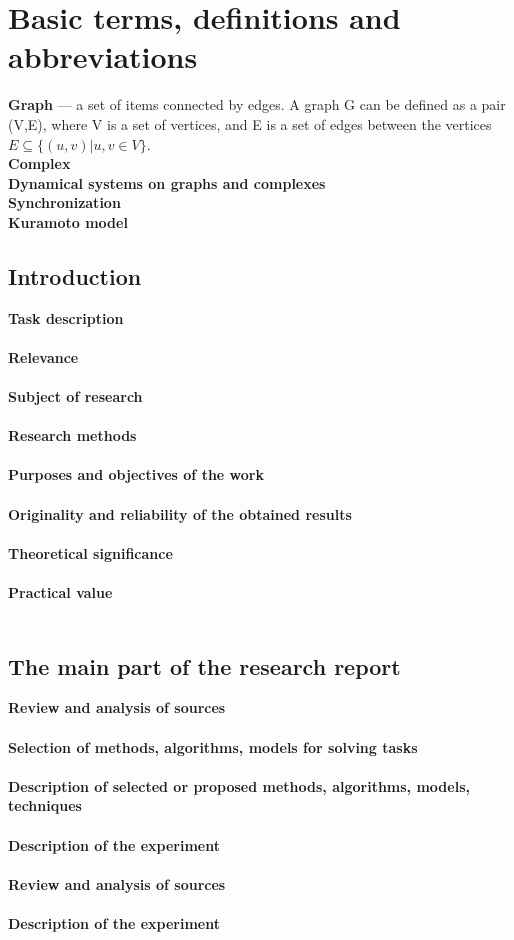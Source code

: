 \documentclass[draft]{article}
\begin{document}
\section {Basic terms, definitions and abbreviations}
\textbf{Graph} — a set of items connected by edges. A graph G can be defined as a pair (V,E), where V is a set of vertices, and E is a set of edges between the vertices  $E \subseteq \{(u,v) | u, v \in V\}$\cite{litlink1}.\\
\textbf{Complex}\\
\textbf{Dynamical systems on graphs and complexes}\\
\textbf{Synchronization}\\
\textbf{Kuramoto model}\\
\newpage
\begin{center}
\item\section {Introduction}
\end{center}
\textbf{Task description}\\
~\\
\textbf{Relevance}\\
~\\
\textbf{Subject of research}\\
~\\
\textbf{Research methods}\\
~\\
\textbf{Purposes and objectives of the work}\\
~\\
\textbf{Originality and reliability of the obtained results}\\
~\\
\textbf{Theoretical significance}\\
~\\
\textbf{Practical value}\\
~\\
\newpage
\begin{center}
\section {The main part of the research report}
\end{center}
\textbf{Review and analysis of sources}\\
~\\
\textbf{Selection of methods, algorithms, models for solving tasks}\\
~\\
\textbf{Description of selected or proposed methods, algorithms, models, techniques}\\
~\\
\textbf{Description of the experiment}\\
~\\
\textbf{Review and analysis of sources}\\
~\\
\textbf{Description of the experiment}\\
~\\
\end{document}
